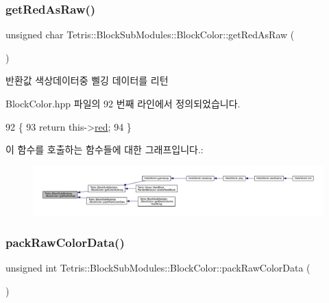 \subsubsection{\texorpdfstring{get\+Red\+As\+Raw()}{getRedAsRaw()}}
{\footnotesize\ttfamily unsigned char Tetris\+::\+Block\+Sub\+Modules\+::\+Block\+Color\+::get\+Red\+As\+Raw (\begin{DoxyParamCaption}{ }\end{DoxyParamCaption})\hspace{0.3cm}{\ttfamily [inline]}}

\begin{DoxyReturn}{반환값}
색상데이터중 삘깅 데이터를 리턴 
\end{DoxyReturn}


Block\+Color.\+hpp 파일의 92 번째 라인에서 정의되었습니다.


\begin{DoxyCode}
92                                        \{
93                 \textcolor{keywordflow}{return} this->\hyperlink{class_tetris_1_1_block_sub_modules_1_1_block_color_af8a0dc372e7dbab300290eadada8ef49}{red};
94             \}
\end{DoxyCode}
이 함수를 호출하는 함수들에 대한 그래프입니다.\+:
\nopagebreak
\begin{figure}[H]
\begin{center}
\leavevmode
\includegraphics[width=350pt]{de/d44/class_tetris_1_1_block_sub_modules_1_1_block_color_a1795cf70c847d261645a9690afff7e9c_icgraph}
\end{center}
\end{figure}
\mbox{\label{class_tetris_1_1_block_sub_modules_1_1_block_color_a849ebbb0e900c5efdcb99784767e7a7a}} 
\subsubsection{\texorpdfstring{pack\+Raw\+Color\+Data()}{packRawColorData()}}
{\footnotesize\ttfamily unsigned int Tetris\+::\+Block\+Sub\+Modules\+::\+Block\+Color\+::pack\+Raw\+Color\+Data (\begin{DoxyParamCaption}{ }\end{DoxyParamCaption})\hspace{0.3cm}{\ttfamily [inline]}}

